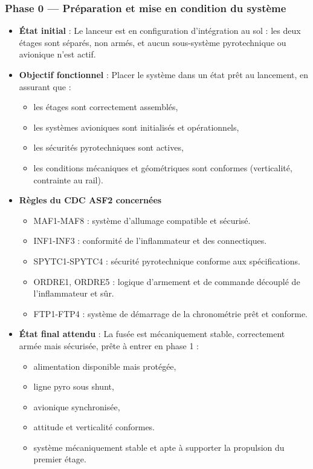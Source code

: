 \subsubsection*{Phase 0 — Préparation et mise en condition du système}
\begin{itemize}
    \item \textbf{État initial} : Le lanceur est en configuration d’intégration au sol : les deux étages sont séparés, non armés, et
    aucun sous-système pyrotechnique ou avionique n’est actif.
    \item \textbf{Objectif fonctionnel} : Placer le système dans un état prêt au lancement, en assurant que :
    \begin{itemize}
        \item les étages sont correctement assemblés,
        \item les systèmes avioniques sont initialisés et opérationnels,
        \item les sécurités pyrotechniques sont actives,
        \item les conditions mécaniques et géométriques sont conformes (verticalité, contrainte au rail).
    \end{itemize}
    \item \textbf{Règles du \acrshort{CDC} ASF2 concernées}
    \begin{itemize}
        \item MAF1-MAF8\cite[p. ~68-70]{CDC_BiEtage} : système d'allumage compatible et sécurisé.
        \item INF1-INF3\cite[p. ~73-75]{CDC_BiEtage} : conformité de l'inflammateur et des connectiques.
        \item SPYTC1-SPYTC4\cite[p. ~76-77]{CDC_BiEtage} : sécurité pyrotechnique conforme aux spécifications.
        \item ORDRE1, ORDRE5\cite[p. ~78-80]{CDC_BiEtage} : logique d'armement et de commande découplé de l'inflammateur et sûr.
        \item FTP1-FTP4\cite[p. ~84-86]{CDC_BiEtage} : système de démarrage de la chronométrie prêt et conforme.
    \end{itemize}
    \item \textbf{État final attendu} : La fusée est mécaniquement stable, correctement armée mais sécurisée, prête à entrer en
    phase 1 :
    \begin{itemize}
        \item alimentation disponible mais protégée,
        \item ligne pyro sous shunt,
        \item avionique synchronisée,
        \item attitude et verticalité conformes.
        \item système mécaniquement stable et apte à supporter la propulsion du premier étage.
    \end{itemize}
\end{itemize}

